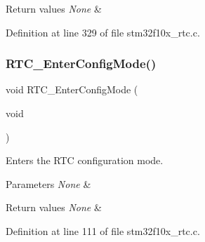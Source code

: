 \begin{DoxyRetVals}{Return values}
{\em None} & \\
\hline
\end{DoxyRetVals}


Definition at line 329 of file stm32f10x\+\_\+rtc.\+c.

\mbox{\label{group___r_t_c___exported___functions_ga23612d9da2fe057a0cd72c684e5b438a}} 
\subsubsection{\texorpdfstring{R\+T\+C\+\_\+\+Enter\+Config\+Mode()}{RTC\_EnterConfigMode()}}
{\footnotesize\ttfamily void R\+T\+C\+\_\+\+Enter\+Config\+Mode (\begin{DoxyParamCaption}\item[{void}]{ }\end{DoxyParamCaption})}



Enters the R\+TC configuration mode. 


\begin{DoxyParams}{Parameters}
{\em None} & \\
\hline
\end{DoxyParams}

\begin{DoxyRetVals}{Return values}
{\em None} & \\
\hline
\end{DoxyRetVals}


Definition at line 111 of file stm32f10x\+\_\+rtc.\+c.

